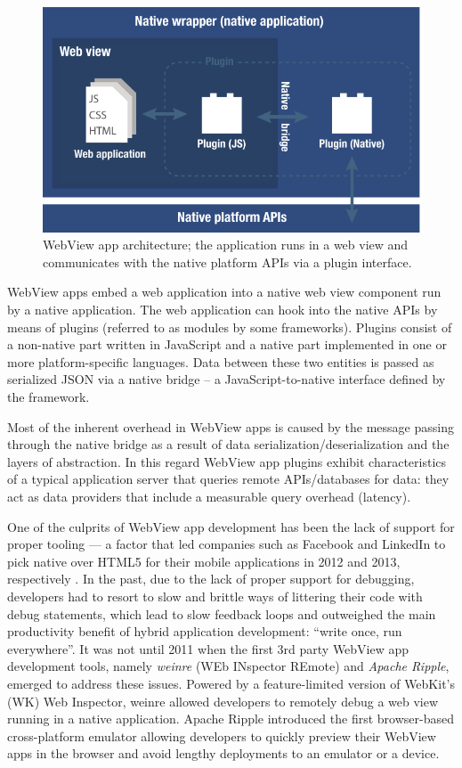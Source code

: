 \documentclass[thesis.tex]{subfiles}
\begin{document}
\begin{figure}[ht]
\centering \includegraphics[width=\textwidth]{images/web-view-app-structure}
\caption{WebView app architecture; the application runs in a web view and communicates with the native platform APIs via a plugin interface.\label{fig:web-view-app}}
\end{figure}

WebView apps embed a web application into a native web view component run by a native application. The web application can hook into the native APIs by means of plugins (referred to as modules by some frameworks). Plugins consist of a non-native part written in JavaScript and a native part implemented in one or more platform-specific languages. Data between these two entities is passed as serialized JSON via a native bridge -- a JavaScript-to-native interface defined by the framework.

Most of the inherent overhead in WebView apps is caused by the message passing through the native bridge as a result of data serialization/deserialization and the layers of abstraction. In this regard WebView app plugins exhibit characteristics of a typical application server that queries remote APIs/databases for data: they act as data providers that include a measurable query overhead (latency).

One of the culprits of WebView app development has been the lack of support for proper tooling --- a factor that led companies such as Facebook and LinkedIn to pick native over HTML5 for their mobile applications in 2012 and 2013, respectively \cite{html_vs_native_facebook}\cite{html_vs_native_linkedin}. In the past, due to the lack of proper support for debugging, developers had to resort to slow and brittle ways of littering their code with debug statements, which lead to slow feedback loops and outweighed the main productivity benefit of hybrid application development: ``write once, run everywhere''. It was not until 2011 when the first 3rd party WebView app development tools, namely \textit{weinre} (WEb INspector REmote) and \textit{Apache Ripple}, emerged to address these issues. Powered by a feature-limited version of WebKit's (WK) Web Inspector, weinre allowed developers to remotely debug a web view running in a native application. Apache Ripple introduced the first browser-based cross-platform emulator allowing developers to quickly preview their WebView apps in the browser and avoid lengthy deployments to an emulator or a device.
\end{document}
